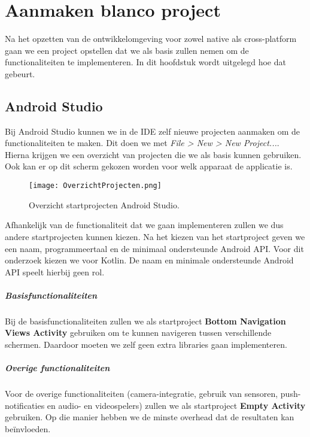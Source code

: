 
\chapter{Aanmaken blanco project}%
\label{ch:projecten}

Na het opzetten van de ontwikkelomgeving voor zowel native als cross-platform gaan we een project opstellen dat we als basis zullen nemen om de functionaliteiten te implementeren. In dit hoofdstuk wordt uitgelegd hoe dat gebeurt.

\section{Android Studio}
Bij Android Studio kunnen we in de IDE zelf nieuwe projecten aanmaken om de functionaliteiten te maken. Dit doen we met \textit{File > New > New Project...}. Hierna krijgen we een overzicht van projecten die we als basis kunnen gebruiken. Ook kan er op dit scherm gekozen worden voor welk apparaat de applicatie is.
\begin{figure}[H]
    \centering
    \texttt{[image: OverzichtProjecten.png]}
    \caption{Overzicht startprojecten Android Studio.}
\end{figure}
Afhankelijk van de functionaliteit dat we gaan implementeren zullen we dus andere startprojecten kunnen kiezen. Na het kiezen van het startproject geven we een naam, programmeertaal en de minimaal ondersteunde Android API. Voor dit onderzoek kiezen we voor Kotlin. De naam en minimale ondersteunde Android API speelt hierbij geen rol.

\paragraph{Basisfunctionaliteiten}
\label{par:basisfunctionaliteiten}
Bij de basisfunctionaliteiten zullen we als startproject \textbf{Bottom Navigation Views Activity} gebruiken om te kunnen navigeren tussen verschillende schermen. Daardoor moeten we zelf geen extra libraries gaan implementeren.

\paragraph{Overige functionaliteiten}
Voor de overige functionaliteiten (camera-integratie, gebruik van sensoren, push-notificaties en audio- en videospelers) zullen we als startproject \textbf{Empty Activity} gebruiken. Op die manier hebben we de minste \gls{overhead} dat de resultaten kan beïnvloeden.

